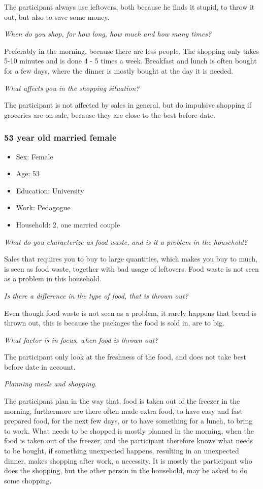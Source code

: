 The participant always use leftovers, both because he finds it stupid, to throw it out, but also to save some money.

\emph{When do you shop, for how long, how much and how many times?}

Preferably in the morning, because there are less people. The shopping only takes 5-10 minutes and is done 4 - 5 times a week. Breakfast and lunch is often bought for a few days, where the dinner is mostly bought at the day it is needed.

\emph{What affects you in the shopping situation?}

The participant is not affected by sales in general, but do impulsive shopping if groceries are on sale, because they are close to the best before date.
\subsubsection{53 year old married female}
\begin{itemize}
  \item Sex: Female
  \item Age: 53
  \item Education: University
  \item Work: Pedagogue
  \item Household: 2, one married couple
\end{itemize}
\emph{What do you characterize as food waste, and is it a problem in the household?}

Sales that requires you to buy to large quantities, which makes you buy to much, is seen as food waste, together with bad usage of leftovers. Food waste is not seen as a problem in this household.

\emph{Is there a difference in the type of food, that is thrown out?}

Even though food waste is not seen as a problem, it rarely happens that bread is thrown out, this is because the packages the food is sold in, are to big.

\emph{What factor is in focus, when food is thrown out?}

The participant only look at the freshness of the food, and does not take best before date in account.

\emph{Planning meals and shopping.}

The participant plan in the way that, food is taken out of the freezer in the morning, furthermore are there often made extra food, to have easy and fast prepared food, for the next few days, or to have something for a lunch, to bring to work. What needs to be shopped is mostly planned in the morning, when the food is taken out of the freezer, and the participant therefore knows what needs to be bought, if something unexpected happens, resulting in an unexpected dinner, makes shopping after work, a necessity. It is mostly the participant who does the shopping, but the other person in the household, may be asked to do some shopping.

